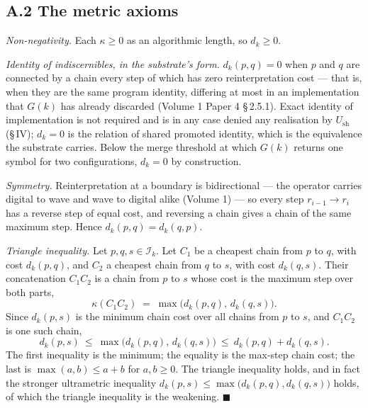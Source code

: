 \documentclass[11pt,oneside]{report}
\theoremstyle{definition}
\theoremstyle{remark}
\begin{document}
\subsection*{A.2 The metric axioms}

\emph{Non-negativity.} Each \ensuremath{\kappa \ge 0} as an algorithmic length,
so \ensuremath{d_k \ge 0}.

\emph{Identity of indiscernibles, in the substrate's form.}
\ensuremath{d_k(p, q) = 0} when \ensuremath{p} and \ensuremath{q} are connected
by a chain every step of which has zero reinterpretation cost --- that is, when
they are the same program identity, differing at most in an implementation that
\ensuremath{G(k)} has already discarded (Volume 1 Paper 4 \S\,2.5.1). Exact
identity of implementation is not required and is in any case denied any
realisation by \ensuremath{U_{\mathrm{sh}}} (\S\,IV); \ensuremath{d_k = 0} is
the relation of shared promoted identity, which is the equivalence the
substrate carries. Below the merge threshold at which \ensuremath{G(k)} returns
one symbol for two configurations, \ensuremath{d_k = 0} by construction.

\emph{Symmetry.} Reinterpretation at a boundary is bidirectional --- the
operator carries digital to wave and wave to digital alike (Volume 1) --- so
every step \ensuremath{r_{i-1} \to r_i} has a reverse step of equal cost, and
reversing a chain gives a chain of the same maximum step. Hence
\ensuremath{d_k(p, q) = d_k(q, p)}.

\emph{Triangle inequality.} Let \ensuremath{p, q, s \in \mathcal{I}_k}. Let
\ensuremath{C_1} be a cheapest chain from \ensuremath{p} to \ensuremath{q},
with cost \ensuremath{d_k(p, q)}, and \ensuremath{C_2} a cheapest chain from
\ensuremath{q} to \ensuremath{s}, with cost \ensuremath{d_k(q, s)}. Their
concatenation \ensuremath{C_1 C_2} is a chain from \ensuremath{p} to
\ensuremath{s} whose cost is the maximum step over both parts,
\[
\kappa(C_1 C_2) \;=\; \max\bigl(d_k(p, q),\, d_k(q, s)\bigr).
\]
Since \ensuremath{d_k(p, s)} is the minimum chain cost over all chains from
\ensuremath{p} to \ensuremath{s}, and \ensuremath{C_1 C_2} is one such chain,
\[
d_k(p, s)\ \le\ \max\bigl(d_k(p, q),\, d_k(q, s)\bigr)\ \le\ d_k(p, q) + d_k(q, s).
\]
The first inequality is the minimum; the equality is the max-step chain cost;
the last is \ensuremath{\max(a,b) \le a + b} for \ensuremath{a, b \ge 0}. The
triangle inequality holds, and in fact the stronger ultrametric inequality
\ensuremath{d_k(p, s) \le \max\bigl(d_k(p, q), d_k(q, s)\bigr)} holds, of which
the triangle inequality is the weakening. \hfill\ensuremath{\blacksquare}
\end{document}
